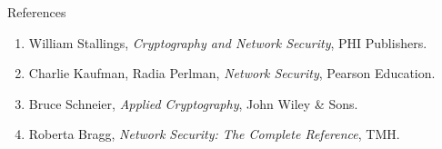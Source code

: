\documentclass[aspectratio=169,11pt,xcolor={table}]{beamer}
\begin{document}
\begin{frame}{References}
  \begin{enumerate}\setlength{\itemsep}{8pt}
    \item William Stallings, \emph{Cryptography and Network Security}, PHI Publishers.
    \item Charlie Kaufman, Radia Perlman, \emph{Network Security}, Pearson Education.
    \item Bruce Schneier, \emph{Applied Cryptography}, John Wiley \& Sons.
    \item Roberta Bragg, \emph{Network Security: The Complete Reference}, TMH.
  \end{enumerate}
  \vspace{6mm}
  \centering
\end{frame}
\end{document}
